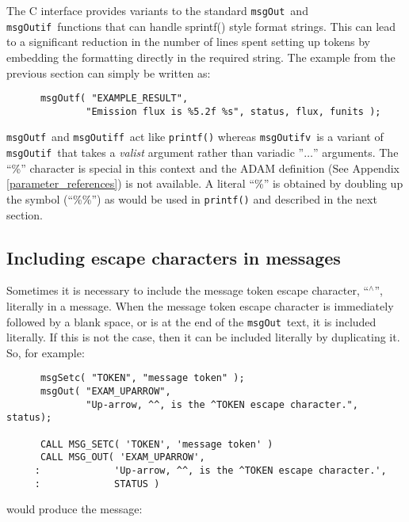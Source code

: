 \documentclass[twoside,11pt]{article}
\newcommand{\htmlref}[2]{#1}
\newcommand{\latex}[1]{#1}
\newcommand{\xlabel}[1]{}
\renewcommand{\_}{\texttt{\symbol{95}}}
\newcommand{\func}[1]{\texttt{#1}}
\newcommand{\farg}[1]{\textit{#1}}
\newcommand{\msgout}{\func{msgOut}}
\newcommand{\msgoutf}{\func{msgOutf}}
\newcommand{\msgoutif}{\func{msgOutif}}
\newcommand{\msgoutiff}{\func{msgOutiff}}
\newcommand{\msgoutifv}{\func{msgOutifv}}
\begin{document}
The C interface provides variants to the standard \msgout\ and
\msgoutif\ functions that can handle sprintf() style format
strings. This can lead to a significant reduction in the number of
lines spent setting up tokens by embedding the formatting directly
in the required string. The example from the previous section can
simply be written as:

\begin{small}
\begin{verbatim}
      msgOutf( "EXAMPLE_RESULT",
              "Emission flux is %5.2f %s", status, flux, funits );
\end{verbatim}
\end{small}

\msgoutf\ and \msgoutiff\ act like \func{printf()} whereas \msgoutifv\
is a variant of \msgoutif\ that takes a \farg{va\_list} argument rather
than variadic ''$\ldots$'' arguments. The ``\%'' character is special
in this context and the \htmlref{ADAM
definition}{parameter_references}
\latex{(See Appendix \ref{parameter_references})} is not available. A literal ``\%''
is obtained by doubling up the symbol (``\%\%'') as would be used in
\func{printf()} and described in the next section.

\subsection{\xlabel{including_escape_characters_in_messages}Including escape characters in messages}
Sometimes it is necessary to include the message token escape character,
``$^\wedge$'', literally in a message. 
When the message token escape character is immediately followed by a blank
space, or is at the end of the \msgout\ text, it is included literally. 
If this is not the case, then it can be included literally by duplicating it.
So, for example:

\begin {small}
\begin{verbatim}
      msgSetc( "TOKEN", "message token" );
      msgOut( "EXAM_UPARROW",
              "Up-arrow, ^^, is the ^TOKEN escape character.", status);

      CALL MSG_SETC( 'TOKEN', 'message token' )
      CALL MSG_OUT( 'EXAM_UPARROW', 
     :             'Up-arrow, ^^, is the ^TOKEN escape character.', 
     :             STATUS )
\end{verbatim}
\end {small}

would produce the message:
\end{document}
